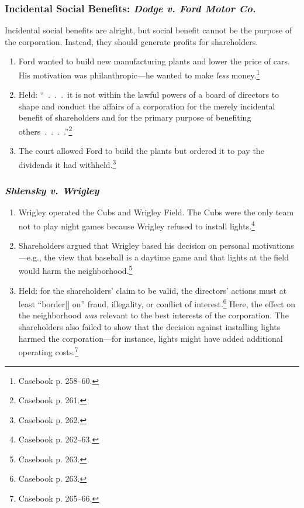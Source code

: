 \subsubsection{Incidental Social Benefits: \emph{Dodge v. Ford Motor Co.}}

Incidental social benefits are alright, but social benefit cannot be the 
purpose of the corporation. Instead, they should generate profits for 
shareholders.

\begin{enumerate}
    \item Ford wanted to build new manufacturing plants and lower the price of 
    cars. His motivation was philanthropic---he wanted to make \emph{less} 
    money.\footnote{Casebook p. 258--60.}
    \item Held: ``~.~.~.~it is not within the lawful powers of a board of 
    directors to shape and conduct the affairs of a corporation for the merely 
    incidental benefit of shareholders and for the primary purpose of 
    benefiting others~.~.~.~.''\footnote{Casebook p. 261.}
    \item The court allowed Ford to build the plants but ordered it to pay 
    the dividends it had withheld.\footnote{Casebook p. 262.}
\end{enumerate}

\subsubsection{\emph{Shlensky v. Wrigley}}

\begin{enumerate}
    \item Wrigley operated the Cubs and Wrigley Field. The Cubs were the only 
    team not to play night games because Wrigley refused to install 
    lights.\footnote{Casebook p. 262--63.}
    \item Shareholders argued that Wrigley based his decision on personal 
    motivations---e.g., the view that baseball is a daytime game and that 
    lights at the field would harm the neighborhood.\footnote{Casebook p. 
    263.}
    \item Held: for the shareholders' claim to be valid, the directors' 
    actions must at least ``border[] on'' fraud, illegality, or conflict of 
    interest.\footnote{Casebook p. 263.} Here, the effect on the neighborhood 
    \emph{was} relevant to the best interests of the corporation. The 
    shareholders also failed to show that the decision against installing 
    lights harmed the corporation---for instance, lights might have added 
    additional operating costs.\footnote{Casebook p. 265--66.}
\end{enumerate}

